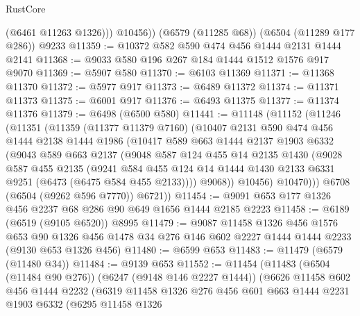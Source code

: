 \begin{lexlean}{RustCore}
\begin{coremodule}
            (@6461 @11263 @1326)))
        @10456))
    (@6579 (@11285 @68))
    (@6504 (@11289 @177 @286))
    @9233
@11359 := @10372 @582 @590 @474 @456 @1444 @2131 @1444 @2141
@11368 := @9033 @580 @196 @267 @184 @1444 @1512 @1576 @917 @9070
@11369 := @5907 @580
@11370 := @6103 @11369
@11371 := @11368 @11370
@11372 := @5977 @917
@11373 := @6489 @11372
@11374 := @11371 @11373
@11375 := @6001 @917
@11376 := @6493 @11375
@11377 := @11374 @11376
@11379 := @6498 (@6500 @580)
@11441 := @11148
    (@11152
      (@11246
        (@11351
          (@11359
            (@11377 @11379 @7160)
            (@10407
              @2131
              @590
              @474
              @456
              @1444
              @2138
              @1444
              @1986
              (@10417
                @589
                @663
                @1444
                @2137
                @1903
                @6332
                (@9043
                  @589
                  @663
                  @2137
                  (@9048
                    @587
                    @124
                    @455
                    @14
                    @2135
                    @1430
                    (@9028
                      @587
                      @455
                      @2135
                      (@9241
                        @584
                        @455
                        @124
                        @14
                        @1444
                        @1430
                        @2133
                        @6331
                        @9251
                        (@6473 (@6475 @584 @455 @2133))))
                    @9068))
                @10456)
              @10470)))
        @6708
        (@6504 (@9262 @596 @7770))
        @6721))
@11454 := @9091 @653 @177 @1326 @456 @2237 @68 @286 @90 @649 @1656 @1444 @2185 @2223
@11458 := @6189 (@6519 (@9105 @6520)) @8995
@11479 := @9087
    @11458
    @1326
    @456
    @1576
    @653
    @90
    @1326
    @456
    @1478
    @34
    @276
    @146
    @602
    @2227
    @1444
    @1444
    @2233
    (@9130 @653 @1326 @456)
@11480 := @6599 @653
@11483 := @11479 (@6579 (@11480 @34))
@11484 := @9139 @653
@11552 := @11454
    (@11483
      (@6504 (@11484 @90 @276))
      (@6247 (@9148 @146 @2227 @1444))
      (@6626
        @11458
        @602
        @456
        @1444
        @2232
        (@6319
          @11458
          @1326
          @276
          @456
          @601
          @663
          @1444
          @2231
          @1903
          @6332
          (@6295
            @11458
            @1326

\end{coremodule}
\end{lexlean}
